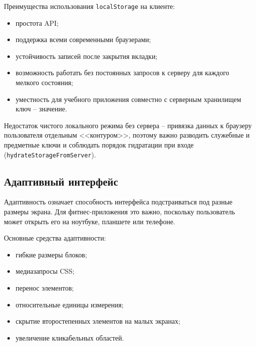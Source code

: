 Преимущества использования \texttt{localStorage} на клиенте:
\begin{itemize}
	\item простота API;
	\item поддержка всеми современными браузерами;
	\item устойчивость записей после закрытия вкладки;
	\item возможность работать без постоянных запросов к серверу для каждого мелкого состояния;
	\item уместность для учебного приложения совместно с серверным хранилищем ключ -- значение.
\end{itemize}

Недостаток чистого локального режима без сервера -- привязка данных к браузеру пользователя отдельным <<контуром>>, поэтому важно разводить служебные и предметные ключи и соблюдать порядок гидратации при входе (\texttt{hydrateStorageFromServer}).



\subsection{Адаптивный интерфейс}

Адаптивность означает способность интерфейса подстраиваться под разные размеры экрана. Для фитнес-приложения это важно, поскольку пользователь может открыть его на ноутбуке, планшете или телефоне.

Основные средства адаптивности:
\begin{itemize}
	\item гибкие размеры блоков;
	\item медиазапросы CSS;
	\item перенос элементов;
	\item относительные единицы измерения;
	\item скрытие второстепенных элементов на малых экранах;
	\item увеличение кликабельных областей.
\end{itemize}

